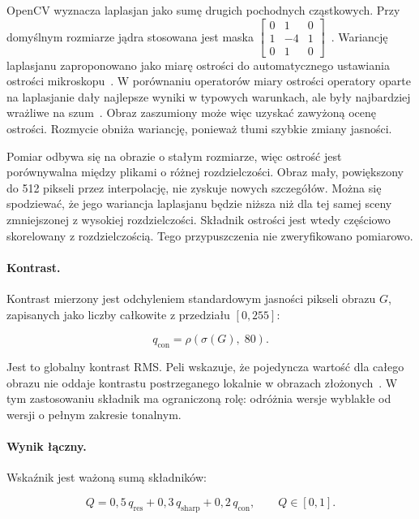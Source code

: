 OpenCV wyznacza laplasjan jako sumę drugich pochodnych
cząstkowych. Przy domyślnym rozmiarze jądra stosowana jest maska
\(\begin{bmatrix}0&1&0\\1&-4&1\\0&1&0\end{bmatrix}\)~\cite{opencv_laplacian}.
Wariancję laplasjanu zaproponowano jako miarę ostrości do
automatycznego ustawiania ostrości mikroskopu~\cite{pechpacheco2000}.
W porównaniu operatorów miary ostrości operatory oparte na
laplasjanie dały najlepsze wyniki w typowych warunkach, ale były
najbardziej wrażliwe na szum~\cite{pertuz2013focus}. Obraz
zaszumiony może więc uzyskać zawyżoną ocenę ostrości. Rozmycie
obniża wariancję, ponieważ tłumi szybkie zmiany jasności.

Pomiar odbywa się na obrazie o stałym rozmiarze, więc ostrość jest
porównywalna między plikami o różnej rozdzielczości. Obraz mały,
powiększony do 512 pikseli przez interpolację, nie zyskuje nowych
szczegółów. Można się spodziewać, że jego wariancja laplasjanu będzie
niższa niż dla tej samej sceny zmniejszonej z wysokiej rozdzielczości.
Składnik ostrości jest wtedy częściowo skorelowany z rozdzielczością.
Tego przypuszczenia nie zweryfikowano pomiarowo.

\paragraph{Kontrast.}
Kontrast mierzony jest odchyleniem standardowym jasności pikseli
obrazu \(G\), zapisanych jako liczby całkowite z przedziału
\([0,255]\):

\begin{equation}
\label{eq:q-contrast}
q_{\mathrm{con}}=\rho\!\left(\sigma(G),\;80\right).
\end{equation}

Jest to globalny kontrast RMS. Peli wskazuje, że pojedyncza wartość
dla całego obrazu nie oddaje kontrastu postrzeganego lokalnie
w obrazach złożonych~\cite{peli1990contrast}. W tym zastosowaniu
składnik ma ograniczoną rolę: odróżnia wersje wyblakłe od wersji
o pełnym zakresie tonalnym.

\paragraph{Wynik łączny.}
Wskaźnik jest ważoną sumą składników:

\begin{equation}
\label{eq:quality-total}
Q=0{,}5\,q_{\mathrm{res}}+0{,}3\,q_{\mathrm{sharp}}+0{,}2\,q_{\mathrm{con}},
\qquad Q\in[0,1].
\end{equation}


